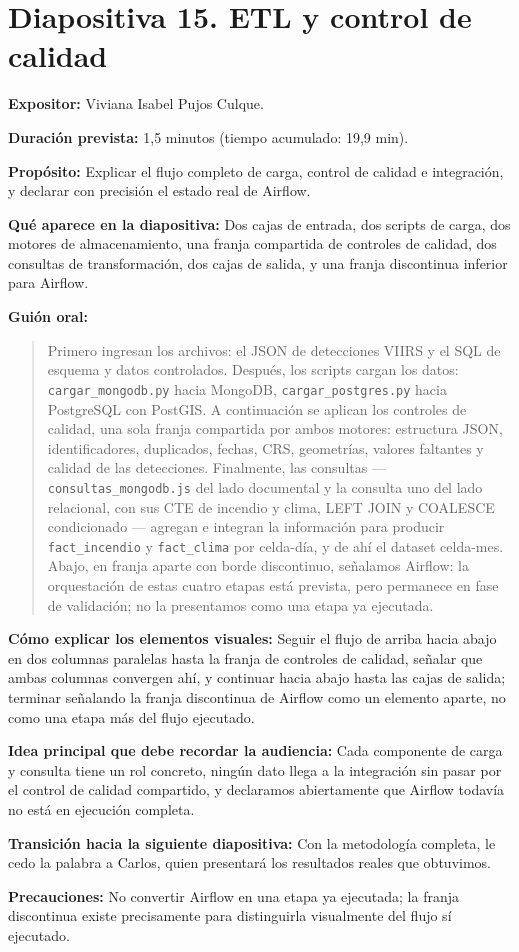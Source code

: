 \documentclass[11pt,a4paper]{article}
\newcommand{\campo}[2]{\par\medskip\noindent\textbf{#1:} #2\par}
\newenvironment{guionoral}{%
  \medskip\noindent\textbf{Gui\'on oral:}\par\smallskip
  \begin{quote}\small
}{%
  \end{quote}
}
\newcommand{\separadordiapositiva}{\bigskip\noindent{\color{Tierra!60}\hrulefill}\bigskip}
\begin{document}
\separadordiapositiva

\section*{Diapositiva 15. ETL y control de calidad}

\campo{Expositor}{Viviana Isabel Pujos Culque.}
\campo{Duraci\'on prevista}{1,5 minutos (tiempo acumulado: 19,9 min).}
\campo{Prop\'osito}{Explicar el flujo completo de carga, control de
calidad e integraci\'on, y declarar con precisi\'on el estado real de
Airflow.}
\campo{Qu\'e aparece en la diapositiva}{Dos cajas de entrada, dos
scripts de carga, dos motores de almacenamiento, una franja compartida
de controles de calidad, dos consultas de transformaci\'on, dos cajas
de salida, y una franja discontinua inferior para Airflow.}

\begin{guionoral}
Primero ingresan los archivos: el JSON de detecciones VIIRS y el SQL
de esquema y datos controlados. Despu\'es, los scripts cargan los
datos: \texttt{cargar\_mongodb.py} hacia MongoDB,
\texttt{cargar\_postgres.py} hacia PostgreSQL con PostGIS. A
continuaci\'on se aplican los controles de calidad, una sola franja
compartida por ambos motores: estructura JSON, identificadores,
duplicados, fechas, CRS, geometr\'ias, valores faltantes y calidad de
las detecciones. Finalmente, las consultas --- \texttt{consultas\_mongodb.js}
del lado documental y la consulta uno del lado relacional, con sus CTE
de incendio y clima, LEFT JOIN y COALESCE condicionado --- agregan e
integran la informaci\'on para producir \texttt{fact\_incendio} y
\texttt{fact\_clima} por celda-d\'ia, y de ah\'i el dataset celda-mes.
Abajo, en franja aparte con borde discontinuo, se\~nalamos Airflow: la
orquestaci\'on de estas cuatro etapas est\'a prevista, pero permanece
en fase de validaci\'on; no la presentamos como una etapa ya ejecutada.
\end{guionoral}

\campo{C\'omo explicar los elementos visuales}{Seguir el flujo de
arriba hacia abajo en dos columnas paralelas hasta la franja de
controles de calidad, se\~nalar que ambas columnas convergen ah\'i, y
continuar hacia abajo hasta las cajas de salida; terminar se\~nalando
la franja discontinua de Airflow como un elemento aparte, no como una
etapa m\'as del flujo ejecutado.}
\campo{Idea principal que debe recordar la audiencia}{Cada componente
de carga y consulta tiene un rol concreto, ning\'un dato llega a la
integraci\'on sin pasar por el control de calidad compartido, y
declaramos abiertamente que Airflow todav\'ia no est\'a en ejecuci\'on
completa.}
\campo{Transici\'on hacia la siguiente diapositiva}{Con la metodolog\'ia
completa, le cedo la palabra a Carlos, quien presentar\'a los
resultados reales que obtuvimos.}
\campo{Precauciones}{No convertir Airflow en una etapa ya ejecutada; la
franja discontinua existe precisamente para distinguirla visualmente
del flujo s\'i ejecutado.}
\end{document}
